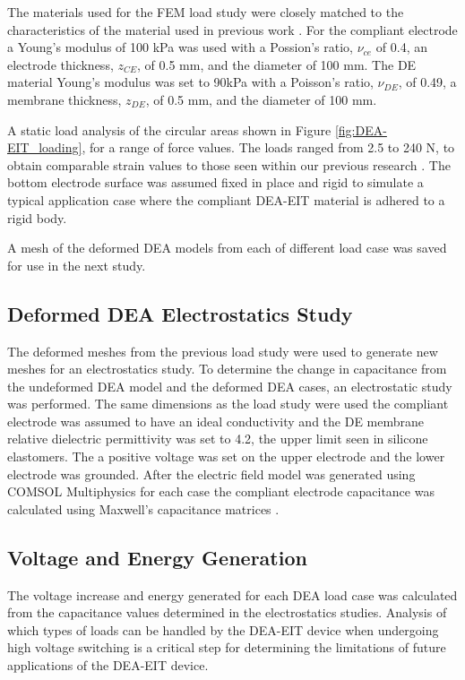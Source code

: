 The materials used for the FEM load study were closely matched to the characteristics of the material used in previous work \cite{Ellingham2024}. For the compliant electrode a Young's modulus of 100 kPa was used with a Possion's ratio, $\nu_{ce}$ of 0.4, an electrode thickness, $z_{CE}$, of 0.5 mm, and the diameter of 100 mm. The DE material Young's modulus was set to 90kPa with a Poisson's ratio, $\nu_{DE}$, of 0.49, a membrane thickness, $z_{DE}$, of 0.5 mm, and the diameter of 100 mm. 

A static load analysis of the circular areas shown in Figure \ref{fig:DEA-EIT_loading}, for a range of force values. The loads ranged from 2.5 to 240 N, to obtain comparable strain values to those seen within our previous research \cite{Ellingham2021,Ellingham2024} . The bottom electrode surface was assumed fixed in place and rigid to simulate a typical application case where the compliant DEA-EIT material is adhered to a rigid body.

A mesh of the deformed DEA models from each of different load case was saved for use in the next study.


\subsection{Deformed DEA Electrostatics Study}
The deformed meshes from the previous load study were used to generate new meshes for an electrostatics study. To determine the change in capacitance from the undeformed DEA model and the deformed DEA cases, an electrostatic study was performed. The same dimensions as the load study were used the compliant electrode was assumed to have an ideal conductivity and the DE membrane relative dielectric permittivity was set to 4.2, the upper limit seen in silicone elastomers. The a positive voltage was set on the upper electrode and the lower electrode was grounded. After the electric field model was generated using COMSOL Multiphysics \cite{COMSOL2022} for each case the compliant electrode capacitance was calculated using Maxwell's capacitance matrices \cite{Smolic2021} . 

\subsection{Voltage and Energy Generation}
The voltage increase and energy generated for each DEA load case was calculated from the capacitance values determined in the electrostatics studies. Analysis of which types of loads can be handled by the DEA-EIT device when undergoing high voltage switching is a critical step for determining the limitations of future applications of the DEA-EIT device.



